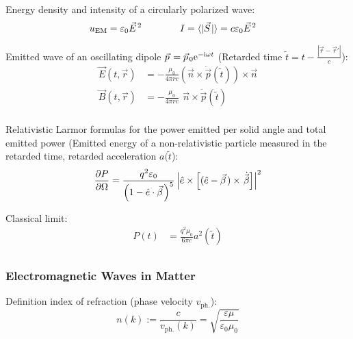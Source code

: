 			\noindent
			Energy density and intensity of a circularly polarized wave:
			\begin{equation}
				\begin{aligned}
					u_{\text{EM}} &= \varepsilon_0\vec{E}^2 &\hsp
					I &= \langle|\vec{S}|\rangle = c\varepsilon_0\vec{E}^2
				\end{aligned}
			\end{equation}

			\noindent
			Emitted wave of an oscillating dipole $\vec{p} = \vec{p}_0 \ex^{-\i\omega t}$ (Retarded time $\tilde{t} = t-\frac{\left|\vec{r}-\vec{r}'\right|}{c}$):
			\begin{equation}
				\begin{aligned}
					\vec{E}(t,\vec{r}) &= -\frac{\mu_0}{4\pi r c}	\left(\vec{n}\times\ddot{\vec{p}}(\tilde{t})\right) \times \vec{n} \\
					\vec{B}(t,\vec{r}) &= -\frac{\mu_0}{4\pi r c} \phantom{\Big(}\vec{n}\times\ddot{\vec{p}}(\tilde{t}) \\
				\end{aligned}
			\end{equation}

			\noindent
			Relativistic Larmor formulas for the power emitted per solid angle and total emitted power (Emitted energy of a non-relativistic particle measured in the retarded time, retarded acceleration $a(\tilde{t}$):
			\begin{equation}
				\begin{aligned}
					\pdv{P}{\Omega} &= \frac{q^2 \varepsilon_0}{\qty(1-\hat{e}\cdot\vec{\beta})^5} \left| \hat{e}\times\qty[(\hat{e}-\vec{\beta}) \times \dot{\vec{\beta}}] \right|^2 \\
				\end{aligned}
			\end{equation}

			\noindent
			Classical limit:
			\begin{equation}
				\begin{aligned}
					P(t) &= \frac{q^2 \mu_0}{6\pi c}a^2(\tilde{t}) \\
				\end{aligned}
			\end{equation}


		\subsubsection{Electromagnetic Waves in Matter}
			\noindent
			Definition index of refraction (phase velocity $v_\text{ph.}$):
			\begin{equation}
				n(k) := \frac{c}{v_\text{ph.}(k)} = \sqrt{\frac{\varepsilon\mu}{\varepsilon_0\mu_0}}
			\end{equation}

